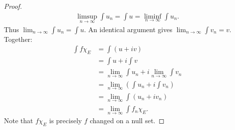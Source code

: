 \begin{proof}
\begin{equation*}
            \begin{split}
                \limsup_{n \rightarrow \infty} \int u_n = \int u = \liminf_{n \rightarrow \infty} \int u_n.
            \end{split}
            \end{equation*}
        Thus $\lim_{n \rightarrow \infty} \int u_n = \int u$. An identical argument gives $\lim_{n \rightarrow \infty}\int v_n = v$. Together:
            \begin{equation*}
            \begin{split}
                \int f \chi_E 
                & = \int (u+iv) \\
                & = \int u + i\int v \\
                & = \lim_{n \rightarrow \infty} \int u_n + i \lim_{n \rightarrow \infty} \int v_n \\
                & = \lim_{n \rightarrow \infty} \left( \int u_n + i \int v_n \right) \\
                & = \lim_{n \rightarrow \infty} \int (u_n + i v_n) \\
                & = \lim_{n \rightarrow \infty} \int f_n \chi_E.
            \end{split}
            \end{equation*}
        Note that $f \chi_E$ is precisely $f$ changed on a null set.
    \end{proof}

